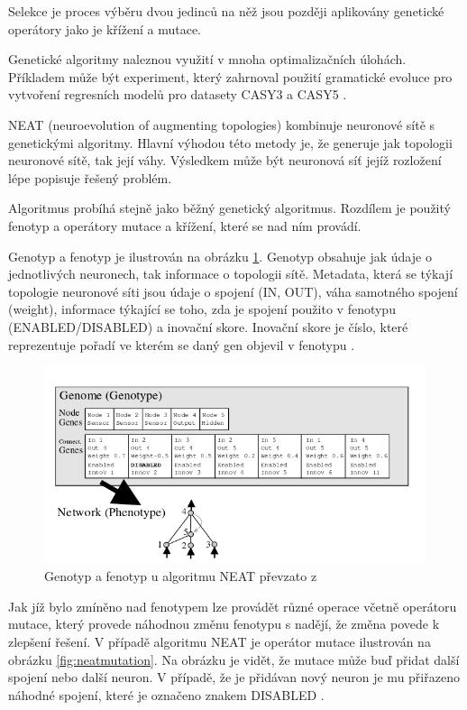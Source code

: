 Selekce je proces výběru dvou jedinců na něž jsou později aplikovány genetické operátory jako je křížení a mutace. 

Genetické algoritmy naleznou využití v mnoha optimalizačních úlohách. Příkladem může být experiment, který zahrnoval použití gramatické evoluce pro vytvoření regresních modelů pro datasety CASY3 a CASY5 \cite[s.~2-9]{differentialEvolution}.

NEAT (neuroevolution of augmenting topologies) kombinuje neuronové sítě s genetickými algoritmy. Hlavní výhodou této metody je, že generuje jak topologii neuronové sítě, tak její váhy. Výsledkem může být neuronová síť jejíž rozložení lépe popisuje řešený problém.

Algoritmus probíhá stejně jako běžný genetický algoritmus. Rozdílem je použitý fenotyp a operátory mutace a křížení, které se nad ním provádí.

Genotyp a fenotyp je ilustrován na obrázku \ref{fig:neatgenotypetophenotype}. Genotyp obsahuje jak údaje o jednotlivých neuronech, tak informace o topologii sítě. Metadata, která se týkají topologie neuronové síti jsou údaje o spojení (IN, OUT), váha samotného spojení (weight), informace týkající se toho, zda je spojení použito v fenotypu (ENABLED/DISABLED) a inovační skore. Inovační skore je číslo, které reprezentuje pořadí ve kterém se daný gen objevil v fenotypu \cite[s.~9]{NEAT}. 

\begin{figure}[h!]
	\centering
	\includegraphics[width=0.7\linewidth]{neatGenotypeToPhenotype}
	\caption{Genotyp a fenotyp u algoritmu NEAT převzato z \cite[s.~9]{NEAT}}
	\label{fig:neatgenotypetophenotype}
\end{figure}

Jak jíž bylo zmíněno nad fenotypem lze provádět různé operace včetně operátoru mutace, který provede náhodnou změnu fenotypu s nadějí, že změna povede k zlepšení řešení. V případě algoritmu NEAT je operátor mutace ilustrován na obrázku \ref{fig:neatmutation}. Na obrázku je vidět, že mutace může buď přidat další spojení nebo další neuron. V případě, že je přidávan nový neuron je mu přiřazeno náhodné spojení, které je označeno znakem DISABLED \cite[s.~10]{NEAT}.

